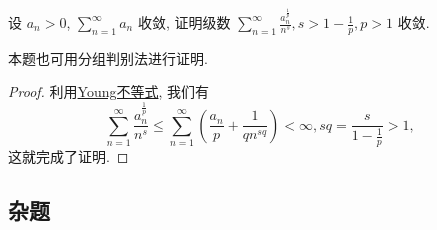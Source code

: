 \documentclass[../../main.tex]{subfiles}
\begin{document}
\begin{example}
设 $a_n > 0$, $\sum_{n=1}^{\infty} a_n$ 收敛, 证明级数 $\sum_{n=1}^{\infty} \frac{a_n^{\frac{1}{p}}}{n^s}, s > 1 - \frac{1}{p}, p > 1$ 收敛.
\end{example}
\begin{remark}
本题也可用分组判别法进行证明.
\end{remark}
\begin{proof}
利用\hyperref[theorem:Young不等式]{Young不等式}, 我们有
\[
\sum_{n=1}^{\infty} \frac{a_n^{\frac{1}{p}}}{n^s} \leqslant \sum_{n=1}^{\infty} \left( \frac{a_n}{p} + \frac{1}{q n^{s q}} \right) < \infty, s q = \frac{s}{1 - \frac{1}{p}} > 1,
\]
这就完成了证明.
\end{proof}



\subsection{杂题}
\end{document}
